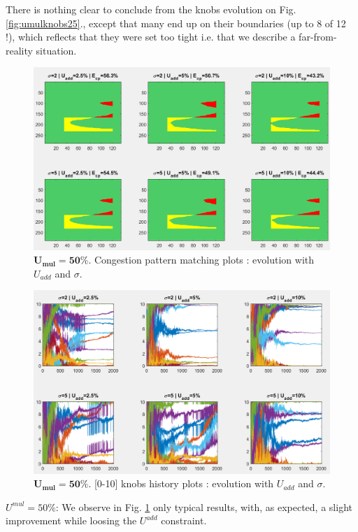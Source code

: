 There is nothing clear to conclude from the knobs evolution on Fig. \ref{fig:umulknobs25}., except that many end up on their boundaries (up to 8 of 12 !), which reflects that they were set too tight i.e. that we describe a far-from-reality situation.
\newpage
\begin{figure}[!h]
	\caption{$\mathbf{U_{mul}=50\%}$. Congestion pattern matching plots : evolution with $U_{add}$ and $\sigma$.}
	\label{fig:umulcp50}
	\centering
	\includegraphics[width=6.8in]{figures/results_figures/Umul/cp_Umul_50_lambda_11.png}
\end{figure}
\begin{figure}[!h]
	\caption{$\mathbf{U_{mul}=50\%}$. [0-10] knobs history plots : evolution with $U_{add}$ and $\sigma$.}
	\label{fig:umulknobs50}
	\includegraphics[width=7in]{figures/results_figures/Umul/knobs_Umul_50_lambda_11.png}
\end{figure}	
\emph{$U^{mul}=50\% $}: We observe in Fig. \ref{fig:umulcp50} only typical results, with, as expected, a slight improvement while loosing the $U^{add}$ constraint.\\
